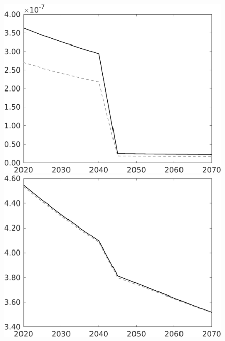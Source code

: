 \begin{figure}[h!!]
\begin{minipage}[]{0.32\textwidth}
\end{minipage}		
\begin{minipage}[]{0.32\textwidth}
\includegraphics[width=1\textwidth]{../../codding_model/own_basedOnFried/optimalPol_010922_revision/figures/all_13Sept22/CompTauf_bytaul_Reg0_gAf_spillover0_nsk0_xgr0_knspil0_sep0_LFlimit1_emsbase0_countec0_GovRev0_etaa0.79_lgd0.png}
\end{minipage}			
\begin{minipage}[]{0.32\textwidth}
\includegraphics[width=1\textwidth]{../../codding_model/own_basedOnFried/optimalPol_010922_revision/figures/all_13Sept22/CompTauf_bytaul_Reg0_gAn_spillover0_nsk0_xgr0_knspil0_sep0_LFlimit1_emsbase0_countec0_GovRev0_etaa0.79_lgd0.png}

\end{minipage}
\end{figure}
